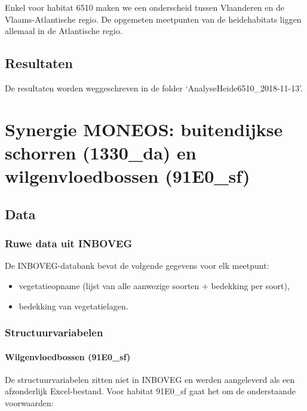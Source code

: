 \documentclass[twoside]{extreport}
\begin{document}
Enkel voor habitat 6510 maken we een onderscheid tussen Vlaanderen en de
Vlaams-Atlantische regio. De opgemeten meetpunten van de heidehabitats
liggen allemaal in de Atlantische regio.

\section{Resultaten}\label{resultaten-1}

De resultaten worden weggeschreven in de folder
`AnalyseHeide6510\_2018-11-13'.

\chapter{Synergie MONEOS: buitendijkse schorren (1330\_da) en
wilgenvloedbossen (91E0\_sf)}\label{h:MONEOS}

\section{Data}\label{data-2}

\subsection{Ruwe data uit INBOVEG}\label{ruwe-data-uit-inboveg-1}

De INBOVEG-databank bevat de volgende gegevens voor elk meetpunt:

\begin{itemize}
\item
  vegetatieopname (lijst van alle aanwezige soorten + bedekking per
  soort),
\item
  bedekking van vegetatielagen.
\end{itemize}

\subsection{Structuurvariabelen}\label{structuurvariabelen}

\subsubsection{Wilgenvloedbossen
(91E0\_sf)}\label{wilgenvloedbossen-91e0_sf}

De structuurvariabelen zitten niet in INBOVEG en werden aangeleverd als
een afzonderlijk Excel-bestand. Voor habitat 91E0\_sf gaat het om de
onderstaande voorwaarden:
\end{document}

